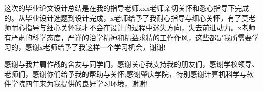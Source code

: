 \documentclass[bachelor, nocolorlinks, printoneside]{seuthesis} %
\begin{document}
\begin{Acknowledgement}{}
    这次的毕业论文设计总结是在我的指导老师xxx老师亲切关怀和悉心指导下完成的。从毕业设计选题到设计完成，x老师给予了我耐心指导与细心关怀，有了莫老师耐心指导与细心关怀我才不会在设计的过程中迷失方向，失去前进动力。x老师有严肃的科学态度，严谨的治学精神和精益求精的工作作风，这些都是我所需要学习的，感谢x老师给予了我这样一个学习机会，谢谢!

    感谢与我并肩作战的舍友与同学们，感谢关心我支持我的朋友们，感谢学校领导、老师们，感谢你们给予我的帮助与关怀;感谢肇庆学院，特别感谢计算机科学与软件学院四年来为我提供的良好学习环境，谢谢!
\end{Acknowledgement}

\newpage
\printindex %



%
%
\end{document}
